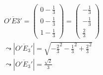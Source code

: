 \begin{gather}
\overline{O'E3'} = \begin{pmatrix}
0-\frac{1}{3}\\0-\frac{1}{3}\\1-\frac{1}{3}
\end{pmatrix} 
=
\begin{pmatrix}
-\frac{1}{3}\\-\frac{1}{3}\\\frac{2}{3}
\end{pmatrix}\\
\leadsto
|\overline{O'E_3'}| = \sqrt{{-\frac{2}{3}}^2 -{\frac{1}{3}}^2 +{\frac{2}{3}}^2}\\
\leadsto
|\overline{O'E_3'}| = \frac{\sqrt{2}}{3}	
\end{gather}








